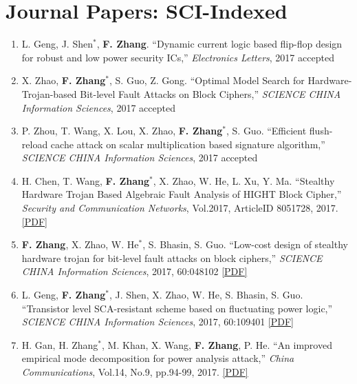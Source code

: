 \documentclass[11pt]{article}
\begin{document}
\section*{Journal Papers: SCI-Indexed}
\begin{enumerate}

\item L. Geng, J. Shen$^\ast$, {\bf F. Zhang}. ``Dynamic current logic based flip-flop design for robust and low power security ICs,'' {\it Electronics Letters}, 2017 {\color{blue}accepted}

\item X. Zhao, {\bf F. Zhang}$^\ast$, S. Guo, Z. Gong. ``Optimal Model Search for Hardware-Trojan-based Bit-level Fault Attacks on Block Ciphers,'' {\it SCIENCE CHINA Information Sciences}, 2017 {\color{blue}accepted}

\item P. Zhou, T. Wang, X. Lou, X. Zhao, {\bf F. Zhang}$^\ast$, S. Guo. ``Efficient flush-reload cache attack on scalar multiplication based signature algorithm,'' {\it SCIENCE CHINA Information Sciences}, 2017 {\color{blue}accepted}

\item H. Chen, T. Wang, {\bf F. Zhang}$^\ast$, X. Zhao, W. He, L. Xu, Y. Ma. ``Stealthy Hardware Trojan Based Algebraic Fault Analysis of HIGHT Block Cipher,'' {\it Security and Communication Networks}, Vol.2017, ArticleID 8051728, 2017. \href{http://www.isee.zju.edu.cn/fanzhang/publications/2017\_SCN\_HIGHT.pdf}{[PDF]}

\item {\bf F. Zhang}, X. Zhao, W. He$^\ast$, S. Bhasin, S. Guo. ``Low-cost design of stealthy hardware trojan for bit-level fault attacks on block ciphers,'' {\it SCIENCE CHINA Information Sciences}, 2017, 60:048102 \href{http://www.isee.zju.edu.cn/fanzhang/publications/2017\_SCIS\_trojan.pdf}{[PDF]}

\item L. Geng, {\bf F. Zhang}$^\ast$, J. Shen, X. Zhao, W. He, S. Bhasin, S. Guo. ``Transistor level SCA-resistant scheme based on fluctuating power logic,'' {\it SCIENCE CHINA Information Sciences}, 2017, 60:109401 \href{http://www.isee.zju.edu.cn/fanzhang/publications/2017\_SCIS\_FPL.pdf}{[PDF]}

\item H. Gan, H. Zhang$^\ast$, M. Khan, X. Wang, {\bf F. Zhang}, P. He. ``An improved empirical mode decomposition for power analysis attack,'' {\it China Communications}, Vol.14, No.9, pp.94-99, 2017.
    \href{http://www.isee.zju.edu.cn/fanzhang/publications/2017\_ChinaComm\_EMD.pdf}{[PDF]}


\end{enumerate}
\end{document}
